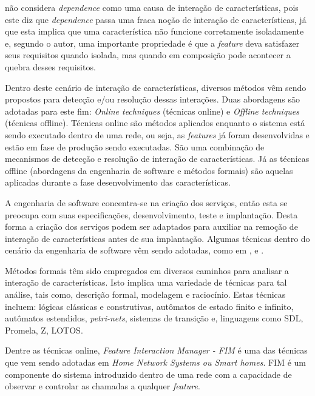 \cite{NHLABATSI:2008} não considera \textit{dependence} como uma causa de interação de características, pois este diz que \textit{dependence} passa uma fraca noção de interação de características, já que esta implica que uma característica não funcione corretamente isoladamente e, segundo o autor, uma importante propriedade é que a \textit{feature} deva satisfazer seus requisitos quando isolada, mas quando em composição pode acontecer a quebra desses requisitos.

Dentro deste cenário de interação de características, diversos métodos vêm sendo propostos para detecção e/ou resolução dessas interações. Duas abordagens são adotadas para este fim: \textit{Online techniques} (técnicas online) e \textit{Offline techniques} (técnicas offline). Técnicas online são métodos aplicados enquanto o sistema está sendo executado dentro de uma rede, ou seja, as \textit{features} já foram desenvolvidas e estão em fase de produção sendo executadas. São uma combinação de mecanismos de detecção e resolução de interação de características. Já as técnicas offline (abordagens da engenharia de software e métodos formais) são aquelas aplicadas durante a fase desenvolvimento das características.\cite{Calder:2003}

A engenharia de software concentra-se na criação dos serviços, então esta se preocupa com suas especificações, desenvolvimento, teste e implantação. Desta forma a criação dos serviços podem ser adaptados para auxiliar na remoção de interação de características antes de sua implantação\cite{Calder:2003}. Algumas técnicas dentro do cenário da engenharia de software vêm sendo adotadas, como em \cite{Thum:2014}, \cite{Siegmund:2012} e \cite{Siegmund2012}.

Métodos formais\cite{Almeida:2011} têm sido empregados em diversos caminhos para analisar a interação de características. Isto implica uma variedade de técnicas para tal análise, tais como, descrição formal, modelagem e raciocínio. Estas técnicas incluem: lógicas clássicas e construtivas, autômatos de estado finito e infinito, autômatos estendidos, \textit{petri-nets}, sistemas de transição e, linguagens como SDL, Promela, Z, LOTOS.\cite{Calder:2003}

Dentre as técnicas online, \textit{Feature Interaction Manager - FIM} é uma das técnicas que vem sendo adotadas em \textit{Home Network Systems ou Smart homes}\cite{Wilson:2005}\cite{Wilson:2008}\cite{Nakamura:2009}. FIM\cite{Calder:2003} é um componente do sistema introduzido dentro de uma rede com a capacidade de observar e controlar as chamadas a qualquer \textit{feature}.

